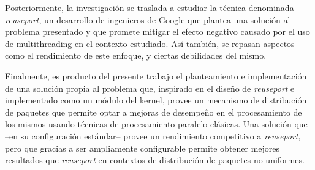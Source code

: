 Posteriormente, la investigación se traslada a estudiar la técnica denominada \emph{reuseport}, un desarrollo de ingenieros de Google que plantea una solución al problema presentado y que promete mitigar el efecto negativo causado por el uso de multithreading en el contexto estudiado. Así también, se repasan aspectos como el rendimiento de este enfoque, y ciertas debilidades del mismo. 

Finalmente, es producto del presente trabajo el planteamiento e implementación de una solución propia al problema que, inspirado en el diseño de \emph{reuseport} e implementado como un módulo del kernel, provee un mecanismo de distribución de paquetes que permite optar a mejoras de desempeño en el procesamiento de los mismos usando técnicas de procesamiento paralelo clásicas. Una solución que --en su configuración estándar-- provee un rendimiento competitivo a \emph{reuseport}, pero que gracias a ser ampliamente configurable permite obtener mejores resultados que \emph{reuseport} en contextos de distribución de paquetes no uniformes. 

